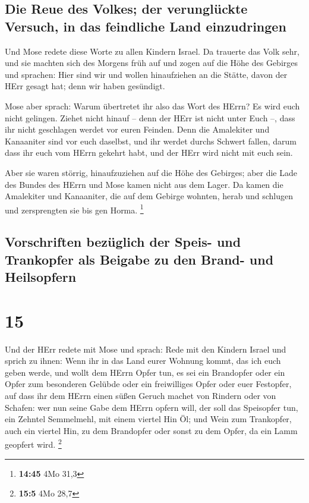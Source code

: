 \hypertarget{die-reue-des-volkes-der-verungluxfcckte-versuch-in-das-feindliche-land-einzudringen}{%
\subsection{Die Reue des Volkes; der verunglückte Versuch, in das
feindliche Land
einzudringen}\label{die-reue-des-volkes-der-verungluxfcckte-versuch-in-das-feindliche-land-einzudringen}}

 Und Mose redete diese Worte zu allen Kindern Israel. Da
trauerte das Volk sehr,  und sie machten sich des Morgens
früh auf und zogen auf die Höhe des Gebirges und sprachen: Hier sind wir
und wollen hinaufziehen an die Stätte, davon der HErr gesagt hat; denn
wir haben gesündigt.

 Mose aber sprach: Warum übertretet ihr also das Wort des
HErrn? Es wird euch nicht gelingen.  Ziehet nicht hinauf
-- denn der HErr ist nicht unter Euch --, dass ihr nicht geschlagen
werdet vor euren Feinden.  Denn die Amalekiter und
Kanaaniter sind vor euch daselbst, und ihr werdet durchs Schwert fallen,
darum dass ihr euch vom HErrn gekehrt habt, und der HErr wird nicht mit
euch sein.

 Aber sie waren störrig, hinaufzuziehen auf die Höhe des
Gebirges; aber die Lade des Bundes des HErrn und Mose kamen nicht aus
dem Lager.  Da kamen die Amalekiter und Kanaaniter, die
auf dem Gebirge wohnten, herab und schlugen und zersprengten sie bis gen
Horma. \footnote{\textbf{14:45} 4Mo 31,3}

\hypertarget{vorschriften-bezuxfcglich-der-speis--und-trankopfer-als-beigabe-zu-den-brand--und-heilsopfern}{%
\subsection{Vorschriften bezüglich der Speis- und Trankopfer als Beigabe
zu den Brand- und
Heilsopfern}\label{vorschriften-bezuxfcglich-der-speis--und-trankopfer-als-beigabe-zu-den-brand--und-heilsopfern}}

\hypertarget{section-14}{%
\section{15}\label{section-14}}

 Und der HErr redete mit Mose und sprach: 
Rede mit den Kindern Israel und sprich zu ihnen: Wenn ihr in das Land
eurer Wohnung kommt, das ich euch geben werde,  und wollt
dem HErrn Opfer tun, es sei ein Brandopfer oder ein Opfer zum besonderen
Gelübde oder ein freiwilliges Opfer oder euer Festopfer, auf dass ihr
dem HErrn einen süßen Geruch machet von Rindern oder von Schafen:
 wer nun seine Gabe dem HErrn opfern will, der soll das
Speisopfer tun, ein Zehntel Semmelmehl, mit einem viertel Hin Öl;
 und Wein zum Trankopfer, auch ein viertel Hin, zu dem
Brandopfer oder sonst zu dem Opfer, da ein Lamm geopfert wird.
\footnote{\textbf{15:5} 4Mo 28,7}

